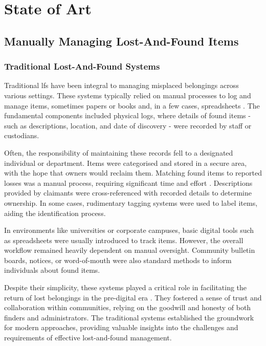 
\chapter{State of Art}
\label{chapter:state_of_art}

\section{Manually Managing Lost-And-Found Items}

\subsection{Traditional Lost-And-Found Systems}

Traditional \ac{lfs} have been integral to managing misplaced belongings across various settings. These systems typically relied on manual processes to log and manage items, sometimes papers or books and, in a few cases, spreadsheets \cite{Anas2023}. The fundamental components included physical logs, where details of found items - such as descriptions, location, and date of discovery - were recorded by staff or custodians.

Often, the responsibility of maintaining these records fell to a designated individual or department. Items were categorised and stored in a secure area, with the hope that owners would reclaim them. Matching found items to reported losses was a manual process, requiring significant time and effort \cite{Anas2023}. Descriptions provided by claimants were cross-referenced with recorded details to determine ownership. In some cases, rudimentary tagging systems were used to label items, aiding the identification process.

In environments like universities or corporate campuses, basic digital tools such as spreadsheets were usually introduced to track items. However, the overall workflow remained heavily dependent on manual oversight. Community bulletin boards, notices, or word-of-mouth were also standard methods to inform individuals about found items.

Despite their simplicity, these systems played a critical role in facilitating the return of lost belongings in the pre-digital era \cite{Mayura2024}. They fostered a sense of trust and collaboration within communities, relying on the goodwill and honesty of both finders and administrators. The traditional systems established the groundwork for modern approaches, providing valuable insights into the challenges and requirements of effective lost-and-found management.

